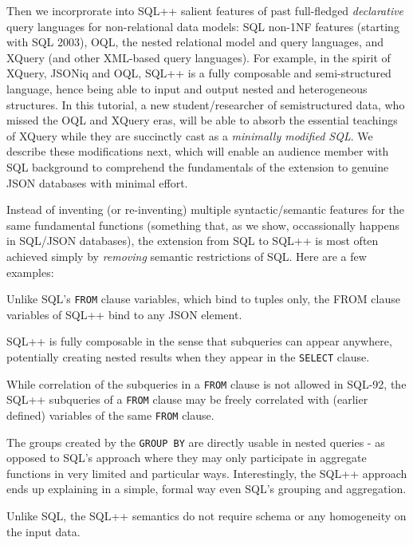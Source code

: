 Then we incorprorate into SQL++ salient features of past full-fledged \textit{declarative} query languages for non-relational data models: SQL non-1NF features (starting with SQL 2003), OQL,
the nested relational model and query languages,
and XQuery (and other XML-based query languages).
For example, in the spirit of XQuery, JSONiq and OQL, SQL++ is a fully composable and semi-structured language, hence being able to input and output nested and heterogeneous structures. In this tutorial, a new student/researcher of semistructured data, who missed the OQL and XQuery eras, will be able to absorb the essential teachings of XQuery while they are succinctly cast as a {\em minimally modified SQL}. We describe these modifications next, which will enable an audience member with SQL background to comprehend the fundamentals of the extension to genuine JSON databases with minimal effort.

  Instead of inventing (or re-inventing) multiple syntactic/semantic features for the same fundamental functions (something that, as we show, occassionally happens in SQL/JSON databases), the extension from SQL to SQL++ is most often achieved simply by {\em removing} semantic restrictions of SQL. Here are a few examples:
\begin{compact_enum}
\item Unlike SQL's \texttt{FROM} clause variables, which bind to tuples only, the FROM clause variables of SQL++ bind to any JSON element.
\item SQL++ is fully composable in the sense that subqueries can appear anywhere, potentially creating nested results when they appear in the \texttt{SELECT} clause.
\item While correlation of the subqueries in a \texttt{FROM} clause is not allowed in SQL-92, the SQL++ subqueries of a \texttt{FROM} clause may be freely correlated with (earlier defined) variables of the same \texttt{FROM} clause.
\item The groups created by the \texttt{GROUP BY} are directly usable in nested queries - as opposed to SQL's approach where they may only participate in aggregate functions in very limited and particular ways. Interestingly, the SQL++ approach ends up explaining in a simple, formal way even SQL's grouping and aggregation.
\item Unlike SQL, the SQL++ semantics do not require schema or any homogeneity on the input data. 
\end{compact_enum}

